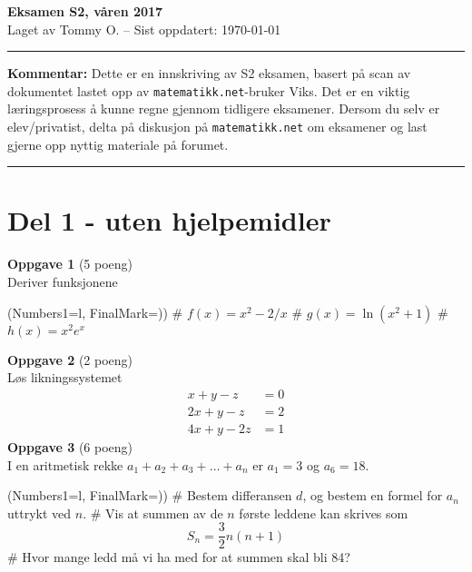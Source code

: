 \documentclass[12pt, a4paper]{article}
\begin{document}
	\pagestyle{fancy}
	{\bfseries \Large Eksamen S2, våren 2017} \\
	{ \footnotesize Laget av Tommy O. -- Sist oppdatert: \today}
	\hrule
	\footnotesize 
	\textbf{Kommentar:}
	Dette er en innskriving av S2 eksamen,
	basert på scan av dokumentet lastet opp
	av \texttt{matematikk.net}-bruker Viks.
	Det er en viktig læringsprosess å kunne regne
	gjennom tidligere eksamener.
	Dersom du selv er elev/privatist, delta på diskusjon på
	\texttt{matematikk.net} om eksamener og last gjerne
	opp nyttig materiale på forumet.
	\normalsize
	
	\hrule
	
\section*{Del 1 - uten hjelpemidler}
\vspace*{2em}
{\bfseries \large Oppgave 1} (5 poeng) \vspace*{1em} \\
Deriver funksjonene
\begin{easylist}[enumerate]
	\ListProperties(Numbers1=l, FinalMark={)})
	# $f(x) = x^2 - 2/x$
	# $g(x) = \ln \left(x^2 + 1\right)$
	# $h(x) = x^2 e^x$
\end{easylist}
\vfill
\vspace*{2em}
{\bfseries \large Oppgave 2} (2 poeng) \vspace*{1em} \\
Løs likningssystemet
\begin{align*}
x + y -z &= 0 \\
2x + y -z &= 2 \\
4x + y -2z &= 1 
\end{align*}
\vfill
\vspace*{2em}
{\bfseries \large Oppgave 3} (6 poeng) \vspace*{1em} \\
I en aritmetisk rekke $a_1 + a_2 + a_3 + \dots + a_n$ 
er $a_1 = 3$ og $a_6 = 18$.
\begin{easylist}[enumerate]
	\ListProperties(Numbers1=l, FinalMark={)})
	# Bestem differansen $d$, og bestem en formel for $a_n$
	uttrykt ved $n$.
	# Vis at summen av de $n$ første leddene kan skrives som
	$$S_n = \frac{3}{2}n (n+1)$$
	# Hvor mange ledd må vi ha med for at summen skal bli 84?
\end{easylist}
\end{document}
